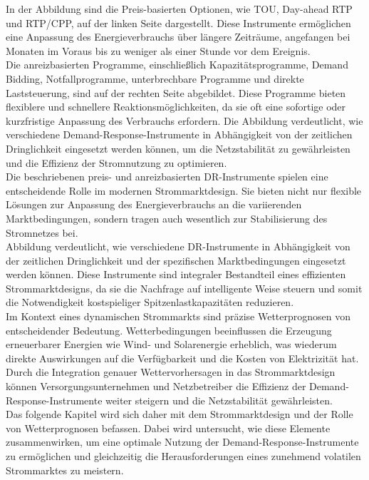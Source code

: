 In der Abbildung  sind die Preis-basierten Optionen, wie TOU, Day-ahead RTP und RTP/CPP, auf der linken Seite dargestellt. Diese Instrumente ermöglichen eine Anpassung des Energieverbrauchs über längere Zeiträume, angefangen bei Monaten im Voraus bis zu weniger als einer Stunde vor dem Ereignis.\\

Die anreizbasierten Programme, einschließlich Kapazitätsprogramme, Demand Bidding, Notfallprogramme, unterbrechbare Programme und direkte Laststeuerung, sind auf der rechten Seite abgebildet. Diese Programme bieten flexiblere und schnellere Reaktionsmöglichkeiten, da sie oft eine sofortige oder kurzfristige Anpassung des Verbrauchs erfordern. Die Abbildung verdeutlicht, wie verschiedene Demand-Response-Instrumente in Abhängigkeit von der zeitlichen Dringlichkeit eingesetzt werden können, um die Netzstabilität zu gewährleisten und die Effizienz der Stromnutzung zu optimieren.\\

Die beschriebenen preis- und anreizbasierten DR-Instrumente spielen eine entscheidende Rolle im modernen Strommarktdesign. Sie bieten nicht nur flexible Lösungen zur Anpassung des Energieverbrauchs an die variierenden Marktbedingungen, sondern tragen auch wesentlich zur Stabilisierung des Stromnetzes bei.\\

Abbildung  verdeutlicht, wie verschiedene DR-Instrumente in Abhängigkeit von der zeitlichen Dringlichkeit und der spezifischen Marktbedingungen eingesetzt werden können. Diese Instrumente sind integraler Bestandteil eines effizienten Strommarktdesigns, da sie die Nachfrage auf intelligente Weise steuern und somit die Notwendigkeit kostspieliger Spitzenlastkapazitäten reduzieren.\\

Im Kontext eines dynamischen Strommarkts sind präzise Wetterprognosen von entscheidender Bedeutung. Wetterbedingungen beeinflussen die Erzeugung erneuerbarer Energien wie Wind- und Solarenergie erheblich, was wiederum direkte Auswirkungen auf die Verfügbarkeit und die Kosten von Elektrizität hat. Durch die Integration genauer Wettervorhersagen in das Strommarktdesign können Versorgungsunternehmen und Netzbetreiber die Effizienz der Demand-Response-Instrumente weiter steigern und die Netzstabilität gewährleisten.\\

Das folgende Kapitel  wird sich daher mit dem Strommarktdesign und der Rolle von Wetterprognosen befassen. Dabei wird untersucht, wie diese Elemente zusammenwirken, um eine optimale Nutzung der Demand-Response-Instrumente zu ermöglichen und gleichzeitig die Herausforderungen eines zunehmend volatilen Strommarktes zu meistern.
